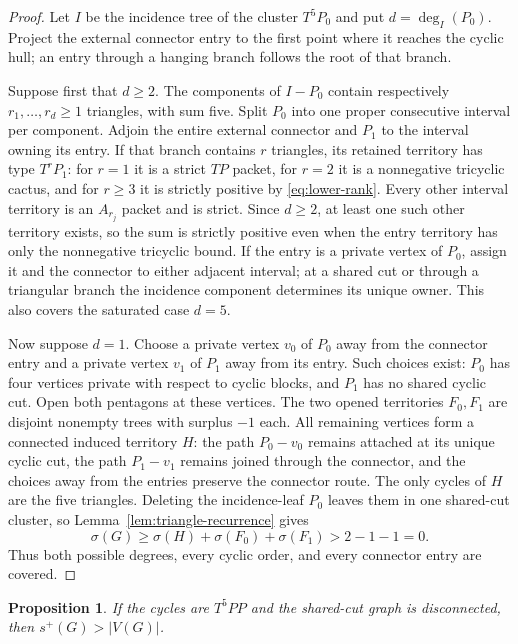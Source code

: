 \documentclass[11pt]{article}
\newtheorem{proposition}[theorem]{Proposition}
\newcommand{\spE}{s^+}
\newcommand{\sig}{\sigma}
\begin{document}
\begin{proof}
Let $I$ be the incidence tree of the cluster $T^5P_0$ and put
$d=\deg_I(P_0)$.  Project the external connector entry to the first point where
it reaches the cyclic hull; an entry through a hanging branch follows the root
of that branch.

Suppose first that $d\geq2$.  The components of $I-P_0$ contain respectively
$r_1,\ldots,r_d\geq1$ triangles, with sum five.  Split $P_0$ into one proper
consecutive interval per component.  Adjoin the entire external connector and
$P_1$ to the interval owning its entry.  If that branch contains $r$ triangles,
its retained territory has type $T^rP_1$: for $r=1$ it is a strict $TP$
packet, for $r=2$ it is a nonnegative tricyclic cactus, and for $r\geq3$ it is
strictly positive by \eqref{eq:lower-rank}.  Every other interval territory is
an $A_{r_j}$ packet and is strict.  Since $d\geq2$, at least one such other
territory exists, so the sum is strictly positive even when the entry territory
has only the nonnegative tricyclic bound.  If the entry is a private vertex of
$P_0$, assign it and the connector to either adjacent interval; at a shared cut
or through a triangular branch the incidence component determines its unique
owner.  This also covers the saturated case $d=5$.

Now suppose $d=1$.  Choose a private vertex $v_0$ of $P_0$ away from the
connector entry and a private vertex $v_1$ of $P_1$ away from its entry.  Such
choices exist: $P_0$ has four vertices private with respect to cyclic blocks,
and $P_1$ has no shared cyclic cut.  Open both pentagons at these vertices.
The two opened territories $F_0,F_1$ are disjoint nonempty trees with surplus
$-1$ each.  All remaining vertices form a connected induced territory $H$:
the path $P_0-v_0$ remains attached at its unique cyclic cut, the path
$P_1-v_1$ remains joined through the connector, and the choices away from the
entries preserve the connector route.  The only cycles of $H$ are the five
triangles.  Deleting the incidence-leaf $P_0$ leaves them in one shared-cut
cluster, so Lemma~\ref{lem:triangle-recurrence} gives
\[
 \sig(G)\geq\sig(H)+\sig(F_0)+\sig(F_1)>2-1-1=0.
\]
Thus both possible degrees, every cyclic order, and every connector entry are
covered.
\end{proof}

\begin{proposition}\label{prop:disconnected-t5pp}
If the cycles are $T^5PP$ and the shared-cut graph is disconnected, then
$\spE(G)>|V(G)|$.
\end{proposition}
\end{document}
